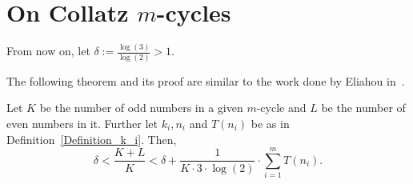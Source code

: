 \documentclass[12pt,reqno]{article}
\begin{document}
\section{On Collatz $m$-cycles}\label{Section4}

\begin{definition}
From now on, let $\delta:=\frac{\log(3)}{\log(2)}>1$.
\end{definition}

The following theorem and its proof are similar to the work done by Eliahou in~\cite{SE}.

\begin{theorem}\label{Theorem11}
Let $K$ be the number of odd numbers in a given $m$-cycle and $L$ be the number of even numbers in it. Further let $k_i, n_i$ and $T(n_i)$  be as in Definition~\ref{Definition_k_i}. Then,
\[\delta<\frac{K+L}{K}<\delta+\frac{1}{K \cdot 3 \cdot \log(2)} \cdot \sum_{i=1}^m T(n_i).\]
\end{theorem}
\end{document}
